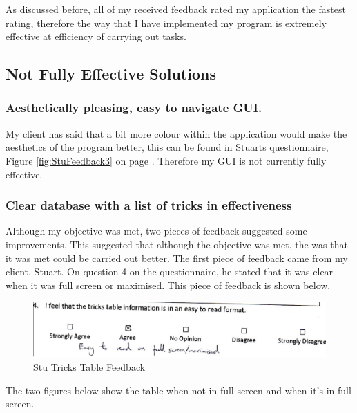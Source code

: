 As discussed before, all of my received feedback rated my application the fastest rating, therefore the way that I have implemented my program is extremely effective at efficiency of carrying out tasks.

\subsection{Not Fully Effective Solutions}

	\subsubsection{Aesthetically pleasing, easy to navigate GUI.}

My client has said that a bit more colour within the application would make the aesthetics of the program better, this can be found in Stuarts questionnaire, Figure \ref{fig:StuFeedback3} on page \pageref{fig:StuFeedback3}. Therefore my GUI is not currently fully effective.

\subsubsection{Clear database with a list of tricks in effectiveness}

Although my objective was met, two pieces of feedback suggested some improvements. This suggested that although the objective was met, the was that it was met could be carried out better. The first piece of feedback came from my client, Stuart. On question 4 on the questionnaire, he stated that it was clear when it was full screen or maximised. This piece of feedback is shown below.

\begin{figure}[H]
    \includegraphics[width=\textwidth]{./Evaluation/images/StuTricks.pdf}
    \caption{Stu Tricks Table Feedback} \label{fig:StuTricksFeedback}
\end{figure}

 The two figures below show the table when not in full screen and when it's in full screen.

